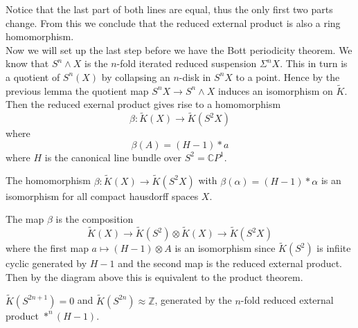 \documentclass[../Thesis.tex]{subfiles}
\begin{document}
\begin{center}
\end{center}
Notice that the last part of both lines are equal, thus the only first two parts change. From this we conclude that the reduced external product is also a ring homomorphism.
\\Now we will set up the last step before we have the Bott periodicity theorem. We know that $S^n \wedge X$ is the $n$-fold iterated reduced suspension $\Sigma^n X$. This in turn is a quotient of $S^n(X)$ by collapsing an $n$-disk in $S^nX$ to a point. Hence by the previous lemma the quotient map $S^nX \rightarrow S^n \wedge X$ induces an isomorphism on $\tilde{K}$.
\\Then the reduced exernal product gives rise to a homomorphism 
\begin{equation}
\beta: \tilde{K}(X) \rightarrow \tilde{K}(S^2 X)
\end{equation} where 
\begin{equation}
\beta(A) = (H - 1) * a
\end{equation}
where $H$ is the canonical line bundle over $S^2 = \mathbb{C}P^1$. 
\begin{theorem}
The homomorphism $\beta : \tilde{K}(X) \rightarrow \tilde{K}(S^2X)$ with $\beta(\alpha) = (H-1) * \alpha$ is an isomorphism for all compact hausdorff spaces $X$.
\end{theorem}
\begin{myproof}
The map $\beta$ is the composition 
\begin{equation}\tilde{K}(X) \rightarrow \tilde{K}(S^2)\otimes \tilde{K}(X) \rightarrow \tilde{K}(S^2X)
\end{equation}
where the first map $a \mapsto (H-1) \otimes A$ is an isomorphism since $\tilde{K}(S^2)$ is infiite cyclic generated by $H-1$ and the second map is the reduced external product. Then by the diagram above this is equivalent to the product theorem.
\end{myproof}
\begin{Cor}
$\tilde{K}(S^{2n+1}) = 0$ and $\tilde{K}(S^{2n}) \approx \mathbb{Z}$, generated by the $n$-fold reduced external product $*^n(H-1)$.
\end{Cor}
\end{document}
